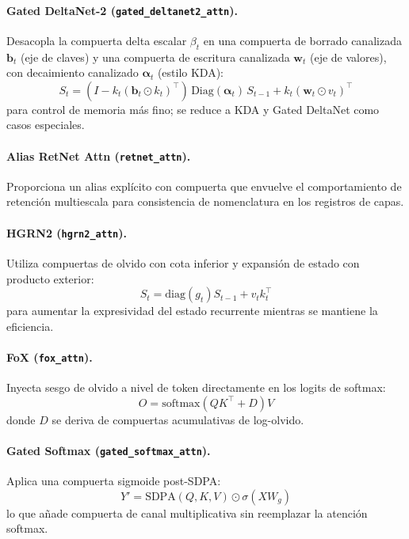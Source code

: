 \documentclass[11pt,a4paper]{article}
\begin{document}
\paragraph{Gated DeltaNet-2 (\texttt{gated\_deltanet2\_attn}).}
Desacopla la compuerta delta escalar $\beta_t$ en una compuerta de borrado canalizada $\mathbf{b}_t$ (eje de claves) y una compuerta de escritura canalizada $\mathbf{w}_t$ (eje de valores), con decaimiento canalizado $\boldsymbol{\alpha}_t$ (estilo KDA):
\[
S_t=(I-k_t(\mathbf{b}_t\odot k_t)^\top)\,\mathrm{Diag}(\boldsymbol{\alpha}_t)\,S_{t-1}+k_t(\mathbf{w}_t\odot v_t)^\top
\]
para control de memoria más fino; se reduce a KDA y Gated DeltaNet como casos especiales.
\citep{hatamizadeh_gated_deltanet2_2026}

\paragraph{Alias RetNet Attn (\texttt{retnet\_attn}).}
Proporciona un alias explícito con compuerta que envuelve el comportamiento de retención multiescala para consistencia de nomenclatura en los registros de capas.
\citep{sun_retentive_2023}

\paragraph{HGRN2 (\texttt{hgrn2\_attn}).}
Utiliza compuertas de olvido con cota inferior y expansión de estado con producto exterior:
\[
S_t=\text{diag}(g_t)S_{t-1}+v_tk_t^\top
\]
para aumentar la expresividad del estado recurrente mientras se mantiene la eficiencia.
\citep{qin_hgrn2_2024}

\paragraph{FoX (\texttt{fox\_attn}).}
Inyecta sesgo de olvido a nivel de token directamente en los logits de softmax:
\[
O=\text{softmax}(QK^\top + D)V
\]
donde $D$ se deriva de compuertas acumulativas de log-olvido.
\citep{lin_forgetting_transformer_2025}

\paragraph{Gated Softmax (\texttt{gated\_softmax\_attn}).}
Aplica una compuerta sigmoide post-SDPA:
\[
Y'=\text{SDPA}(Q,K,V)\odot \sigma(XW_g)
\]
lo que añade compuerta de canal multiplicativa sin reemplazar la atención softmax.
\citep{qiu_gated_attention_2025}
\end{document}
